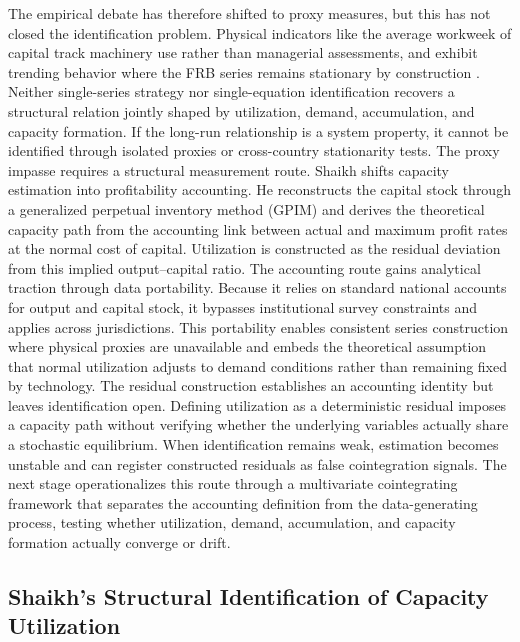 \documentclass[11pt]{article}
\begin{document}
The empirical debate has therefore shifted to proxy measures, but this has not closed the identification problem. Physical indicators like the average workweek of capital track machinery use rather than managerial assessments, and exhibit trending behavior where the FRB series remains stationary by construction \citep{Nikiforos2016, Nikiforos2021}. Neither single-series strategy nor single-equation identification recovers a structural relation jointly shaped by utilization, demand, accumulation, and capacity formation. If the long-run relationship is a system property, it cannot be identified through isolated proxies or cross-country stationarity tests. The proxy impasse requires a structural measurement route. Shaikh \citep{Shaikh2016} shifts capacity estimation into profitability accounting. He reconstructs the capital stock through a generalized perpetual inventory method (GPIM) and derives the theoretical capacity path from the accounting link between actual and maximum profit rates at the normal cost of capital. Utilization is constructed as the residual deviation from this implied output--capital ratio. The accounting route gains analytical traction through data portability. Because it relies on standard national accounts for output and capital stock, it bypasses institutional survey constraints and applies across jurisdictions. This portability enables consistent series construction where physical proxies are unavailable and embeds the theoretical assumption that normal utilization adjusts to demand conditions rather than remaining fixed by technology. The residual construction establishes an accounting identity but leaves identification open. Defining utilization as a deterministic residual imposes a capacity path without verifying whether the underlying variables actually share a stochastic equilibrium. When identification remains weak, estimation becomes unstable and can register constructed residuals as false cointegration signals. The next stage operationalizes this route through a multivariate cointegrating framework that separates the accounting definition from the data-generating process, testing whether utilization, demand, accumulation, and capacity formation actually converge or drift.


\subsection{Shaikh's Structural Identification of Capacity Utilization}
\label{subsec:shaikh_structural_measurement}
\end{document}
